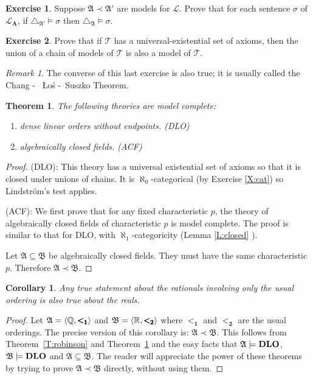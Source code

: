 \documentclass[titlepage, oneside]{amsbook}
\theoremstyle{plain}
\newtheorem{theorem}{Theorem}
\newtheorem{corollary}{Corollary}
\theoremstyle{definition}
\newtheorem{exercise}{Exercise}
\theoremstyle{remark}
\newtheorem*{rem}{Remark}
\newcommand{\theory}{\ensuremath{\mathcal{T}}}
\newcommand{\lan}{\ensuremath{\mathcal{L}}}
\newcommand{\seq}{\ensuremath{\subseteq}}
\newcommand{\ma}{\ensuremath{\mathfrak{A}}}
\newcommand{\mb}{\ensuremath{\mathfrak{B}}}
\newcommand{\masb}{\ensuremath{\mathfrak{A} \subseteq \mathfrak{B}}}
\newcommand{\mapb}{\ensuremath{\mathfrak{A} \prec \mathfrak{B}}}
\newcommand{\ba}{\ensuremath{\mathbf{A}}}
\newcommand{\rat}{\ensuremath{\mathbb{Q}}}
\newcommand{\rea}{\ensuremath{\mathbb{R}}}
\begin{document}
\begin{exercise}  Suppose $\ma \prec \ma'$ are models for $\lan$.
Prove that for each sentence $\sigma$ of $\lan_\ba$, if
$\triangle_{\ma'} \models \sigma$ then $\triangle_\ma \models \sigma$.
\end{exercise}

\begin{exercise}\label{X:uni-exi} Prove that if $\theory$ has a
universal-existential set
of axioms, then the union of a chain of models of $\theory$ is also a
model of $\theory$.
\end{exercise}

\begin{rem} The converse of this last exercise is also true; it is usually 
called the Chang - ~{\L}o{\'s} -~Suszko Theorem.
\end{rem}

\begin{theorem}\label{T:mcomp} The following theories are model complete:
\begin{enumerate}
\item dense linear orders without endpoints. (DLO)
\item algebraically closed fields. (ACF)
\end{enumerate}
\end{theorem}

\begin{proof} (DLO): This theory has a universal existential set of axioms 
so that it is closed under unions of chains.  It is 
$\aleph_0$-categorical (by Exercise \ref{X:cat}) so Lindstr\"{o}m's
test applies.

(ACF): We first prove that for any fixed characteristic $p$, the theory 
of algebraically closed fields of characteristic $p$ is model complete. 
The proof is similar to that for DLO, with $\aleph_1$-categoricity
(Lemma \ref{L:closed} ).


Let $\ma \seq \mb $ be algebraically closed fields. They must have
the 
same characteristic $p$. Therefore $\ma \prec \mb$.

\end{proof}

\begin{corollary}  Any true statement about the rationals involving
only the usual ordering is also true about the reals.
\end{corollary}

\begin{proof}  Let $\ma = \langle \bf{\rat}, \pmb{<_1} \rangle$ and 
$\mb = \langle \bf{\rea}, \pmb{<_2} \rangle$ where $\pmb{<_1}$ and
$\pmb{<_2}$ are the usual orderings.  The precise version of this
corollary is: $\ma \prec \mb$.  This follows from
Theorem~\ref{T:robinson}
and Theorem~\ref{T:mcomp} and the easy facts that $\ma \models
\mbox{\bf{DLO}}$, $\mb \models \mbox{\bf{DLO}}$  and $\masb$.  The
reader will appreciate the power of these theorems by trying to prove
$\mapb$ directly, without using them.
\end{proof}
\end{document}
